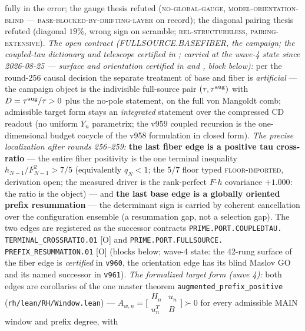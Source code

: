 {fully in the error; the gauge thesis refuted
(\textsc{no-global-gauge}, \textsc{model-orientation-blind} ---
\textsc{base-blocked-by-drifting-layer} on record); the diagonal
pairing thesis refuted (diagonal $19\%$, wrong sign on scramble;
\textsc{rel-structureless}, \textsc{pairing-extensive}).
\emph{The open contract (FULLSOURCE.BASEFIBER, the campaign;
the coupled-tau dictionary and telescope certified in
; carried at the
wave-4 state since 2026-08-25 --- surface and orientation
certified in  and
, block
below):} per the
round-256 causal decision the separate treatment of base and
fiber is \emph{artificial} --- the campaign object is the
indivisible full-source pair $(\tau, \tau^{\rm aug})$ with $D =
\tau^{\rm aug}/\tau > 0$ plus the no-pole statement, on the full
von Mangoldt comb; admissible target form stays an
\emph{integrated} statement over the compressed CD readout (no
uniform $Y_n$ parametrix; the v959 coupled recursion is the
one-dimensional budget cocycle of the v958 formulation in closed
form).  \emph{The precise localization after rounds 256--259:}
\textbf{the last fiber edge is a positive tau cross-ratio} ---
the entire fiber positivity is the one terminal inequality
$h_{N-1}/F_{N-1}^2 > 7/5$ (equivalently $q_N < 1$; the $5/7$
floor typed \textsc{floor-imported}, derivation open; the
measured driver is the rank-perfect $F$-$h$ covariance $+1.000$:
the ratio is the object) --- and \textbf{the last base edge is a
globally oriented prefix resummation} --- the determinant sign is
carried by coherent cancellation over the configuration ensemble
(a resummation gap, not a selection gap).  The two edges are
registered as the successor contracts
\texttt{PRIME.PORT.COUPLEDTAU.\allowbreak
TERMINAL\_CROSSRATIO.01} [O] and
\texttt{PRIME.PORT.FULLSOURCE.\allowbreak
PREFIX\_RESUMMATION.01} [O] (blocks below; wave-4 state: the
42-rung surface of the fiber edge is \emph{certified} in
\texttt{v960}, the orientation edge has its blind Maslov GO and
its named successor in \texttt{v961}).  \emph{The formalized
target form (wave 4):} both edges are corollaries of the one
master theorem \texttt{augmented\_prefix\_positive}
(\texttt{rh/lean/RH/Window.lean}) --- $A_{w,n} = \bigl[\begin{smallmatrix} H_n & u_n\\ u_n^{T} & B \end{smallmatrix}\bigr] \succ 0$
for every admissible MAIN window and prefix degree, with
}

